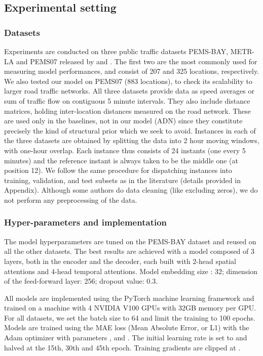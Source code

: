 \documentclass[a4paper]{article}
\begin{document}
\subsection{Experimental setting}
\subsubsection{Datasets}
Experiments are conducted on three public traffic datasets PEMS-BAY, METR-LA and PEMS07 released by \cite{li_diffusion_2017} and \cite{song_spatial-temporal_2020}. The first two are the most commonly used for measuring model performances, and consist of 207 and 325 locations, respectively. We also tested our model on PEMS07 (883 locations), to check its scalability to larger road traffic networks.
All three datasets provide data as speed averages or sum of traffic flow on contiguous 5 minute intervals. They also include distance matrices, holding inter-location distances measured on the road network. These are used only in the baselines, not in our model (ADN) since they constitute precisely the kind of structural prior which we seek to avoid. Instances in each of the three datasets are obtained by splitting the data into 2 hour moving windows, with one-hour overlap. Each instance thus consists of 24 instants (one every 5 minutes) and the reference instant is always taken to be the middle one (at position 12). We follow the same procedure for dispatching instances into training, validation, and test subsets as in the literature (details provided in Appendix). Although some authors do data cleaning (like excluding zeros), we do not perform any preprocessing of the data.
\subsubsection{Hyper-parameters and implementation}
The model hyperparameters are tuned on the PEMS-BAY dataset and reused on all the other datasets. The best results are achieved with a model composed of 3 layers, both in the encoder and the decoder, each built with 2-head spatial attentions and 4-head temporal attentions. Model embedding size : 32; dimension of the feed-forward layer: 256; dropout value: 0.3.

All models are implemented using the PyTorch machine learning framework and trained on a machine with 4 NVIDIA V100 GPUs with 32GB memory per GPU. For all datasets, we set the batch size to 64 and limit the training to 100 epochs. Models are trained using the MAE loss (Mean Absolute Error, or L1) with the Adam optimizer with parameters ,  and . The initial learning rate is set to  and halved at the 15th, 30th and 45th epoch. Training gradients are clipped at .
\end{document}
